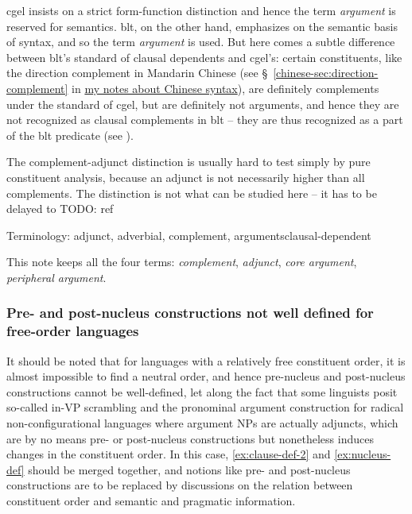 \documentclass{article}
\newcommand*{\citesec}[1]{\S~{#1}}
\newcommand*{\term}[1]{\emph{#1}}
\newcommand{\chinese}{\href{../Chinese/main.pdf}{my notes about Chinese syntax}}
\begin{document}
\ac{cgel} insists on a strict form-function distinction 
and hence the term \term{argument} is reserved for semantics.
\ac{blt}, on the other hand, emphasizes on the semantic basis of syntax, 
and so the term \term{argument} is used.
But here comes a subtle difference between \ac{blt}'s standard of clausal dependents and \ac{cgel}'s:
certain constituents, like the direction complement in Mandarin Chinese 
(see \citesec{\ref{chinese-sec:direction-complement}} in \chinese),
are definitely complements under the standard of \ac{cgel},
but are definitely not arguments, 
and hence they are not recognized as clausal complements in \ac{blt}
-- they are thus recognized as a part of the \ac{blt} predicate (see ).

The complement-adjunct distinction is usually hard to test simply by pure constituent analysis,
because an adjunct is not necessarily higher than all complements.
The distinction is not what can be studied here -- 
it has to be delayed to TODO: ref

\begin{infobox}{Terminology: adjunct, adverbial, complement, arguments}{clausal-dependent}
    

    This note keeps all the four terms: \term{complement}, \term{adjunct}, 
    \term{core argument}, \term{peripheral argument}.
\end{infobox}

\subsubsection{Pre- and post-nucleus constructions not well defined for free-order languages}\label{sec:free-order-blt}

It should be noted that for languages with a relatively free constituent order,
it is almost impossible to find a neutral order, 
and hence pre-nucleus and post-nucleus constructions 
cannot be well-defined,
let along the fact that some linguists posit so-called in-VP scrambling
and the pronominal argument construction for radical non-configurational languages
where argument NPs are actually adjuncts,
which are by no means pre- or post-nucleus constructions 
but nonetheless induces changes in the constituent order.
In this case, \eqref{ex:clause-def-2} and \eqref{ex:nucleus-def} should be merged together,
and notions like pre- and post-nucleus constructions are to be replaced by 
discussions on the relation between constituent order and semantic and pragmatic information.
\end{document}
